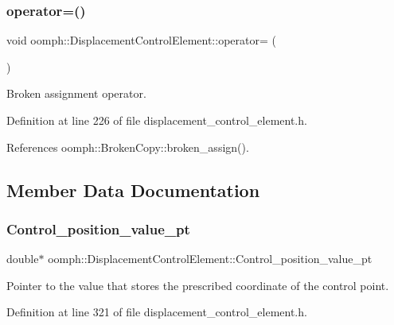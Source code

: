\subsubsection{\texorpdfstring{operator=()}{operator=()}}
{\footnotesize\ttfamily void oomph\+::\+Displacement\+Control\+Element\+::operator= (\begin{DoxyParamCaption}\item[{const \hyperlink{classoomph_1_1DisplacementControlElement}{Displacement\+Control\+Element} \&}]{ }\end{DoxyParamCaption})\hspace{0.3cm}{\ttfamily [inline]}}



Broken assignment operator. 



Definition at line 226 of file displacement\+\_\+control\+\_\+element.\+h.



References oomph\+::\+Broken\+Copy\+::broken\+\_\+assign().



\subsection{Member Data Documentation}
\mbox{\label{classoomph_1_1DisplacementControlElement_a62143307494726baee841e58ac65516c}} 
\subsubsection{\texorpdfstring{Control\+\_\+position\+\_\+value\+\_\+pt}{Control\_position\_value\_pt}}
{\footnotesize\ttfamily double$\ast$ oomph\+::\+Displacement\+Control\+Element\+::\+Control\+\_\+position\+\_\+value\+\_\+pt\hspace{0.3cm}{\ttfamily [protected]}}



Pointer to the value that stores the prescribed coordinate of the control point. 



Definition at line 321 of file displacement\+\_\+control\+\_\+element.\+h.



